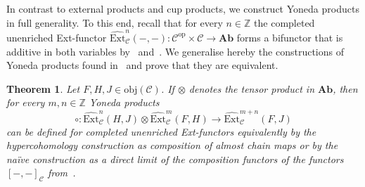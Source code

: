 \documentclass[12pt, a4paper]{article}
\numberwithin{equation}{section}
\newtheorem{thm}{Theorem}[section]
\theoremstyle{empty}
\theoremstyle{nonumberplain}
\begin{document}
In contrast to external products and cup products, we construct Yoneda products in full generality. To this end, recall that for every $n \in \mathbb{Z}$ the completed unenriched Ext-functor $\widehat{\mathrm{Ext}}_{\mathcal{C}}^n(-, -): \mathcal{C}^{\mathrm{op}} \times \mathcal{C} \rightarrow \mathbf{Ab}$ forms a bifunctor that is additive in both variables by~\cite[Proposition~5.8]{ghe24} and~\cite[Proposition~6.5]{ghe24}. We generalise hereby the constructions of Yoneda products found in~\cite[p.~110]{ben92} and prove that they are equivalent.

\begin{thm}\label{thm:yonedaprods}
Let $F, H, J \in \mathrm{obj}(\mathcal{C})$. If $\otimes$ denotes the tensor product in $\mathbf{Ab}$, then for every $m, n \in \mathbb{Z}$ Yoneda products
    \[ \circ: \widehat{\mathrm{Ext}}_{\mathcal{C}}^n(H, J) \otimes \widehat{\mathrm{Ext}}_{\mathcal{C}}^m(F, H) \rightarrow \widehat{\mathrm{Ext}}_{\mathcal{C}}^{m+n}(F, J) \]
    can be defined for completed unenriched Ext-functors equivalently by the hypercohomology construction as composition of almost chain maps or by the naïve construction as a direct limit of the composition functors of the functors $[-, -]_{\mathcal{C}}$ from~\cite[Proposition~5.1]{ghe24}.
\end{thm}
\end{document}
